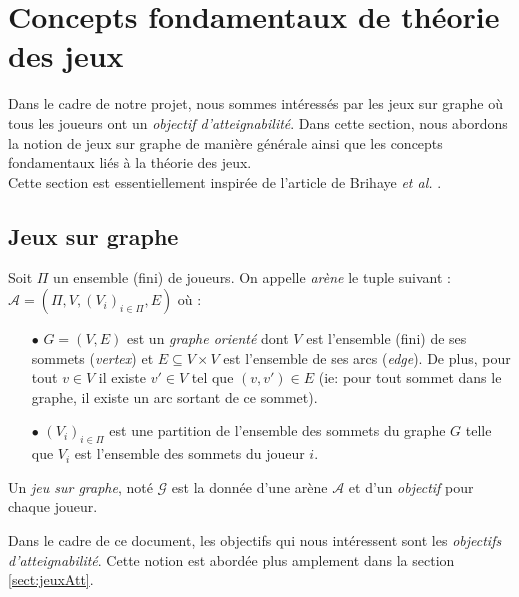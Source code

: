 
\section{Concepts fondamentaux de théorie des jeux}
Dans le cadre de notre projet, nous sommes intéressés par les jeux sur graphe où tous les joueurs ont un \textit{objectif d'atteignabilité}.
Dans cette section, nous abordons la notion de jeux sur graphe de manière générale ainsi que les concepts fondamentaux liés à la théorie des jeux.\\
Cette section est essentiellement inspirée de l'article de Brihaye \emph{et al.} \cite{DBLP:conf/lfcs/BrihayePS13}.

\subsection{Jeux sur graphe}




\begin{defi}[Arène]
	Soit $\Pi$ un ensemble (fini) de joueurs. On appelle \textit{arène} le tuple suivant :\\
	 $\mathcal{A} = (\Pi,V , (V_{i})_{i\in{\Pi}}, E )$ où :
	\begin{enumerate}
		\item[$\bullet$] $G = (V,E)$ est un \textit{graphe orienté}  dont $V$ est l'ensemble (fini) de ses sommets (\textit{vertex}) et $E \subseteq V \times V$ est l'ensemble de ses arcs (\textit{edge}). De plus, pour tout $ v\in V $ il existe $v'\in V$ tel que $(v,v') \in E$ (ie: pour tout sommet dans le graphe, il existe un arc sortant de ce sommet).
		\item[$\bullet$] $(V_{i})_{i\in\Pi}$ est une partition de l'ensemble des sommets du graphe $G$ telle que $V_{i}$ est l'ensemble des sommets du joueur $i$.
	\end{enumerate}
\end{defi}


\begin{defi}
	Un \textit{jeu sur graphe}, noté $\mathcal{G}$ est la donnée d'une arène $\mathcal{A}$ et d'un \textit{objectif} pour chaque joueur.
\end{defi}

\begin{rem}
	Dans le cadre de ce document, les objectifs qui nous intéressent sont les \textit{objectifs d'atteignabilité}. Cette notion est abordée plus amplement dans la section \ref{sect:jeuxAtt}.
\end{rem}

